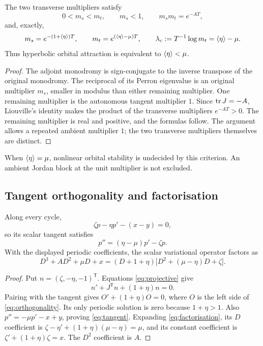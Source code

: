 \begin{proposition}\label{prop:multipliers}
The two transverse multipliers satisfy
\begin{equation}\label{eq:multipliers}
0<m_s<m_t,\qquad m_s<1,\qquad m_sm_t=e^{-AT},
\end{equation}
and, exactly,
\begin{equation}\label{eq:exponent}
m_s=e^{-(1+\left\langle \eta\right\rangle)T},\qquad
m_t=e^{(\left\langle \eta\right\rangle-\mu)T},\qquad
\lambda_c:=T^{-1}\log m_t=\left\langle \eta\right\rangle-\mu.
\end{equation}
Thus hyperbolic orbital attraction is equivalent to $\left\langle \eta\right\rangle<\mu$.
\end{proposition}
\begin{proof}
The adjoint monodromy is sign-conjugate to the inverse transpose of the original monodromy. The reciprocal of its Perron eigenvalue is an original multiplier $m_s$, smaller in modulus than either remaining multiplier. One remaining multiplier is the autonomous tangent multiplier $1$. Since $\operatorname{tr} J=-A$, Liouville's identity makes the product of the transverse multipliers $e^{-AT}>0$. The remaining multiplier is real and positive, and the formulas follow. The argument allows a repeated ambient multiplier $1$; the two transverse multipliers themselves are distinct.
\end{proof}
When $\left\langle \eta\right\rangle=\mu$, nonlinear orbital stability is undecided by this criterion. An ambient Jordan block at the unit multiplier is not excluded.

\subsection{Tangent orthogonality and factorisation}\label{adj:sec:factor}
\begin{proposition}\label{prop:factor}
Along every cycle,
\begin{equation}\label{eq:orthogonality}
\zeta p-\eta p'-(x-y)=0,
\end{equation}
so its scalar tangent satisfies
\begin{equation}\label{eq:tangent}
p''=(\eta-\mu)p'-\zeta p.
\end{equation}
With the displayed periodic coefficients, the scalar variational operator factors as
\begin{equation}\label{eq:factorisation}
D^3+AD^2+\mu D+x=(D+1+\eta)\bigl[D^2+(\mu-\eta)D+\zeta\bigr].
\end{equation}
\end{proposition}
\begin{proof}
Put $n=(\zeta,-\eta,-1)^{\mathsf T}$. Equations \eqref{eq:projective} give
\[
n'+J^{\mathsf T}n+(1+\eta)n=0.
\]
Pairing with the tangent gives $O'+(1+\eta)O=0$, where $O$ is the left side of \eqref{eq:orthogonality}. Its only periodic solution is zero because $1+\eta>1$. Also $p''=-\mu p'-x+y$, proving \eqref{eq:tangent}. Expanding \eqref{eq:factorisation}, its $D$ coefficient is $\zeta-\eta'+(1+\eta)(\mu-\eta)=\mu$, and its constant coefficient is $\zeta'+(1+\eta)\zeta=x$. The $D^2$ coefficient is $A$.
\end{proof}

